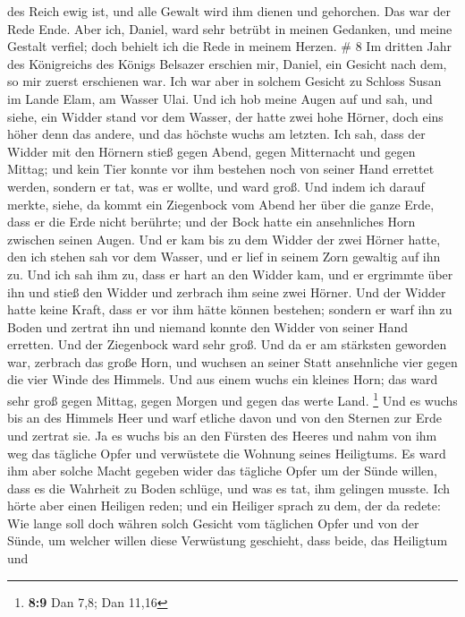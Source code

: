 des Reich ewig ist, und alle Gewalt wird ihm dienen und gehorchen.
 Das war der Rede Ende. Aber ich, Daniel, ward sehr betrübt
in meinen Gedanken, und meine Gestalt verfiel; doch behielt ich die Rede
in meinem Herzen. \# 8  Im dritten Jahr des Königreichs des
Königs Belsazer erschien mir, Daniel, ein Gesicht nach dem, so mir
zuerst erschienen war.  Ich war aber in solchem Gesicht zu
Schloss Susan im Lande Elam, am Wasser Ulai.  Und ich hob
meine Augen auf und sah, und siehe, ein Widder stand vor dem Wasser, der
hatte zwei hohe Hörner, doch eins höher denn das andere, und das höchste
wuchs am letzten.  Ich sah, dass der Widder mit den Hörnern
stieß gegen Abend, gegen Mitternacht und gegen Mittag; und kein Tier
konnte vor ihm bestehen noch von seiner Hand errettet werden, sondern er
tat, was er wollte, und ward groß.  Und indem ich darauf
merkte, siehe, da kommt ein Ziegenbock vom Abend her über die ganze
Erde, dass er die Erde nicht berührte; und der Bock hatte ein
ansehnliches Horn zwischen seinen Augen.  Und er kam bis zu
dem Widder der zwei Hörner hatte, den ich stehen sah vor dem Wasser, und
er lief in seinem Zorn gewaltig auf ihn zu.  Und ich sah ihm
zu, dass er hart an den Widder kam, und er ergrimmte über ihn und stieß
den Widder und zerbrach ihm seine zwei Hörner. Und der Widder hatte
keine Kraft, dass er vor ihm hätte können bestehen; sondern er warf ihn
zu Boden und zertrat ihn und niemand konnte den Widder von seiner Hand
erretten.  Und der Ziegenbock ward sehr groß. Und da er am
stärksten geworden war, zerbrach das große Horn, und wuchsen an seiner
Statt ansehnliche vier gegen die vier Winde des Himmels. 
Und aus einem wuchs ein kleines Horn; das ward sehr groß gegen Mittag,
gegen Morgen und gegen das werte Land. \footnote{\textbf{8:9} Dan 7,8;
  Dan 11,16}  Und es wuchs bis an des Himmels Heer und warf
etliche davon und von den Sternen zur Erde und zertrat sie.
 Ja es wuchs bis an den Fürsten des Heeres und nahm von ihm
weg das tägliche Opfer und verwüstete die Wohnung seines Heiligtums.
 Es ward ihm aber solche Macht gegeben wider das tägliche
Opfer um der Sünde willen, dass es die Wahrheit zu Boden schlüge, und
was es tat, ihm gelingen musste.  Ich hörte aber einen
Heiligen reden; und ein Heiliger sprach zu dem, der da redete: Wie lange
soll doch währen solch Gesicht vom täglichen Opfer und von der Sünde, um
welcher willen diese Verwüstung geschieht, dass beide, das Heiligtum und
